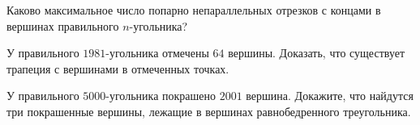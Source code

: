 \documentclass[12pt]{book}
\begin{document}
\begin{task}
Каково максимальное число попарно непараллельных отрезков с концами в вершинах правильного $n$-угольника? 
\end{task}

\begin{task}
У правильного $1981$-угольника отмечены $64$ вершины. Доказать, что существует трапеция с вершинами в отмеченных точках.
\end{task}

\begin{task}
У правильного $5000$-угольника покрашено $2001$ вершина. Докажите, что найдутся три покрашенные вершины, лежащие в вершинах равнобедренного треугольника. 
\end{task}

\begin{solution}

\end{solution}
\end{document}
